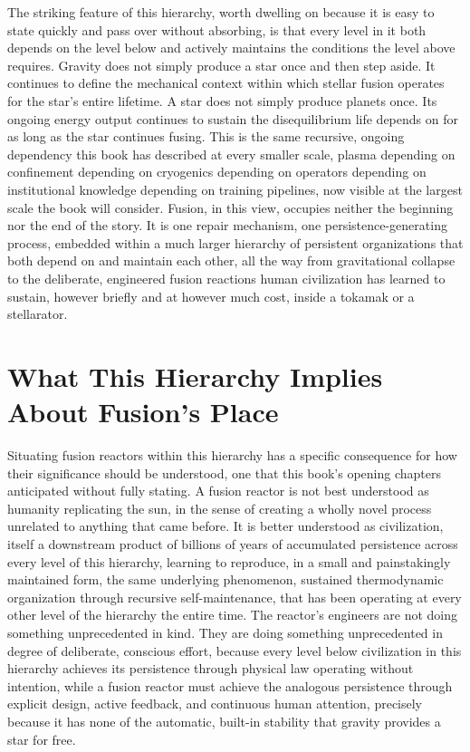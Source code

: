 The striking feature of this hierarchy, worth dwelling on because it is easy to state quickly and pass over without absorbing, is that every level in it both depends on the level below and actively maintains the conditions the level above requires. Gravity does not simply produce a star once and then step aside. It continues to define the mechanical context within which stellar fusion operates for the star's entire lifetime. A star does not simply produce planets once. Its ongoing energy output continues to sustain the disequilibrium life depends on for as long as the star continues fusing. This is the same recursive, ongoing dependency this book has described at every smaller scale, plasma depending on confinement depending on cryogenics depending on operators depending on institutional knowledge depending on training pipelines, now visible at the largest scale the book will consider. Fusion, in this view, occupies neither the beginning nor the end of the story. It is one repair mechanism, one persistence-generating process, embedded within a much larger hierarchy of persistent organizations that both depend on and maintain each other, all the way from gravitational collapse to the deliberate, engineered fusion reactions human civilization has learned to sustain, however briefly and at however much cost, inside a tokamak or a stellarator.

\section{What This Hierarchy Implies About Fusion's Place}

Situating fusion reactors within this hierarchy has a specific consequence for how their significance should be understood, one that this book's opening chapters anticipated without fully stating. A fusion reactor is not best understood as humanity replicating the sun, in the sense of creating a wholly novel process unrelated to anything that came before. It is better understood as civilization, itself a downstream product of billions of years of accumulated persistence across every level of this hierarchy, learning to reproduce, in a small and painstakingly maintained form, the same underlying phenomenon, sustained thermodynamic organization through recursive self-maintenance, that has been operating at every other level of the hierarchy the entire time. The reactor's engineers are not doing something unprecedented in kind. They are doing something unprecedented in degree of deliberate, conscious effort, because every level below civilization in this hierarchy achieves its persistence through physical law operating without intention, while a fusion reactor must achieve the analogous persistence through explicit design, active feedback, and continuous human attention, precisely because it has none of the automatic, built-in stability that gravity provides a star for free.


